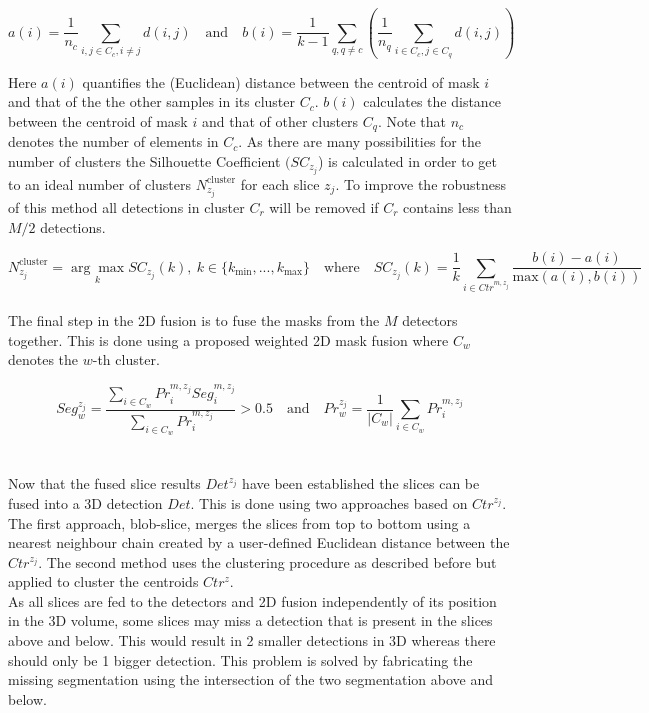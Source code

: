 \documentclass[a4]{article}
\begin{document}
\[a(i) = \frac{1}{n_c} \sum_{i,j \in C_c, i\neq j} d(i,j)  \quad\text{and}\quad b(i) = \frac{1}{k - 1} \sum_{q,q\neq c} \left( \frac{1}{n_q} \sum_{i\in C_c, j\in C_q} d(i,j)\right)   \]

Here \(a(i)\) quantifies the (Euclidean) distance between the centroid of mask \(i\) and that of the the other samples in its cluster \(C_c\). \(b(i)\) calculates the distance between the centroid of mask \(i\) and that of other clusters \(C_q\). Note that \(n_c\) denotes the number of elements in \(C_c\). As there are many possibilities for the number of clusters the Silhouette Coefficient \((SC_{z_j}\)) is calculated in order to get to an ideal number of clusters \(N^{\text{cluster}}_{z_j}\) for each slice \(z_j\). 
To improve the robustness of this method all detections in cluster \(C_r\) will be removed if \(C_r\) contains less than \(M/2\) detections.

\[N^{\text{cluster}}_{z_j} = \underset{k}{\arg\max} SC_{z_j}(k), \ k\in \{k_{\text{min}},..., k_{\text{max}}\} \quad \text{where} \quad SC_{z_j}(k) = \frac{1}{k} \sum_{i \in Ctr^{m, z_j}} \frac{b(i) - a(i)}{\text{max}(a(i), b(i))} \]  \\ 


The final step in the 2D fusion is to fuse the masks from the \(M\) detectors together. This is done using a proposed weighted 2D mask fusion where \(C_w\) denotes the \(w\)-th cluster. 

\[Seg_w^{z_j} =\frac{\sum_{i \in C_w} Pr_i^{m, z_j} Seg_i^{m, z_j}}{\sum_{i \in C_w} Pr_i^{m, z_j}}>0.5 \quad \text{and} \quad Pr_w^{z_j}  =\frac{1}{\left|C_w\right|} \sum_{i \in C_w} Pr_i^{m, z_j}\] \\

\hrulefill \\

Now that the fused slice results \(Det^{z_j}\) have been established the slices can be fused into a 3D detection \(Det\). This is done using two approaches based on \(Ctr^{z_j}\). The first approach, blob-slice, merges the slices from top to bottom using a nearest neighbour chain created by a user-defined Euclidean distance between the \(Ctr^{z_j}\). The second method uses the clustering procedure as described before but applied to cluster the centroids \(Ctr^z\). \\

As all slices are fed to the detectors and 2D fusion independently of its position in the 3D volume, some slices may miss a detection that is present in the slices above and below. This would result in 2 smaller detections in 3D whereas there should only be 1 bigger detection. This problem is solved by fabricating the missing segmentation using the intersection of the two segmentation above and below.
\end{document}
